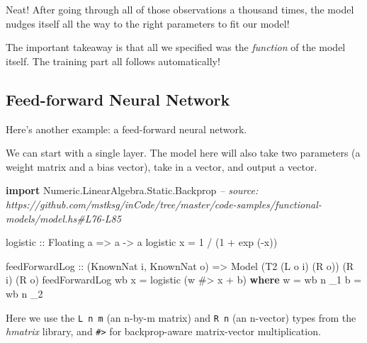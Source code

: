 \documentclass[]{article}
\newenvironment{Shaded}{}{}
\newcommand{\CommentTok}[1]{\textcolor[rgb]{0.38,0.63,0.69}{\textit{#1}}}
\newcommand{\DataTypeTok}[1]{\textcolor[rgb]{0.56,0.13,0.00}{#1}}
\newcommand{\DecValTok}[1]{\textcolor[rgb]{0.25,0.63,0.44}{#1}}
\newcommand{\FunctionTok}[1]{\textcolor[rgb]{0.02,0.16,0.49}{#1}}
\newcommand{\KeywordTok}[1]{\textcolor[rgb]{0.00,0.44,0.13}{\textbf{#1}}}
\newcommand{\NormalTok}[1]{#1}
\newcommand{\OtherTok}[1]{\textcolor[rgb]{0.00,0.44,0.13}{#1}}
\begin{document}
Neat! After going through all of those observations a thousand times, the model
nudges itself all the way to the right parameters to fit our model!

The important takeaway is that all we specified was the \emph{function} of the
model itself. The training part all follows automatically!

\hypertarget{feed-forward-neural-network}{%
\subsection{Feed-forward Neural Network}\label{feed-forward-neural-network}}

Here's another example: a feed-forward neural network.

We can start with a single layer. The model here will also take two parameters
(a weight matrix and a bias vector), take in a vector, and output a vector.

\begin{Shaded}
\begin{Highlighting}[]
\KeywordTok{import} \DataTypeTok{Numeric.LinearAlgebra.Static.Backprop}
\CommentTok{-- source: https://github.com/mstksg/inCode/tree/master/code-samples/functional-models/model.hs#L76-L85}

\OtherTok{logistic ::} \DataTypeTok{Floating}\NormalTok{ a }\OtherTok{=>}\NormalTok{ a }\OtherTok{->}\NormalTok{ a}
\NormalTok{logistic x }\FunctionTok{=} \DecValTok{1} \FunctionTok{/}\NormalTok{ (}\DecValTok{1} \FunctionTok{+}\NormalTok{ exp (}\FunctionTok{-}\NormalTok{x))}

\NormalTok{feedForwardLog}
\OtherTok{    ::}\NormalTok{ (}\DataTypeTok{KnownNat}\NormalTok{ i, }\DataTypeTok{KnownNat}\NormalTok{ o)}
    \OtherTok{=>} \DataTypeTok{Model}\NormalTok{ (}\DataTypeTok{T2}\NormalTok{ (}\DataTypeTok{L}\NormalTok{ o i) (}\DataTypeTok{R}\NormalTok{ o)) (}\DataTypeTok{R}\NormalTok{ i) (}\DataTypeTok{R}\NormalTok{ o)}
\NormalTok{feedForwardLog wb x }\FunctionTok{=}\NormalTok{ logistic (w }\FunctionTok{#>}\NormalTok{ x }\FunctionTok{+}\NormalTok{ b)}
  \KeywordTok{where}
\NormalTok{    w }\FunctionTok{=}\NormalTok{ wb }\FunctionTok{^^.}\NormalTok{ _1}
\NormalTok{    b }\FunctionTok{=}\NormalTok{ wb }\FunctionTok{^^.}\NormalTok{ _2}
\end{Highlighting}
\end{Shaded}

Here we use the \texttt{L\ n\ m} (an n-by-m matrix) and \texttt{R\ n} (an
n-vector) types from the \emph{hmatrix} library, and \texttt{\#\textgreater{}}
for backprop-aware matrix-vector multiplication.
\end{document}
